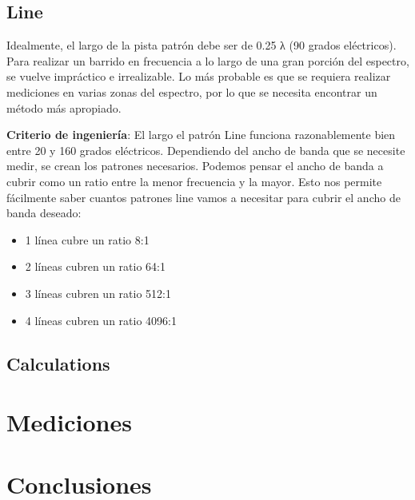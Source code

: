 \documentclass[10pt, a4paper, twocolumn]{article}
\begin{document}
\subsection{Line}

Idealmente, el largo de la pista patrón debe ser de 0.25 λ (90 grados eléctricos). Para realizar un barrido en frecuencia a lo largo de una gran porción del espectro, se vuelve impráctico e irrealizable. Lo más probable es que se requiera realizar mediciones en varias zonas del espectro, por lo que se necesita encontrar un método más apropiado. \newline

\textbf{Criterio de ingeniería}: El largo el patrón Line funciona razonablemente bien entre 20 y 160 grados eléctricos. Dependiendo del ancho de banda que se necesite medir, se crean los patrones necesarios. Podemos pensar el ancho de banda a cubrir como un ratio entre la menor frecuencia y la mayor. Esto nos permite fácilmente saber cuantos patrones line vamos a necesitar
para cubrir el ancho de banda deseado:
\begin{itemize}
\item 1 línea cubre un ratio 8:1
\item 2 líneas cubren un ratio 64:1
\item 3 líneas cubren un ratio 512:1
\item 4 líneas cubren un ratio 4096:1
\end{itemize}

\subsection{Calculations}

\section{Mediciones}

\section{Conclusiones}


\medskip
\end{document}
